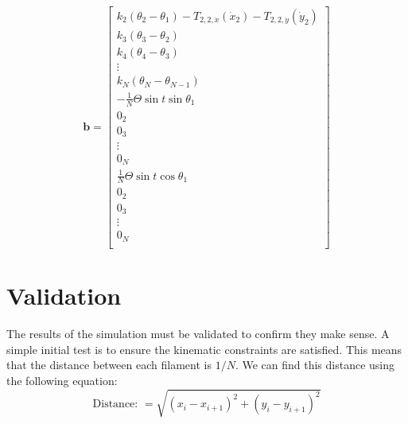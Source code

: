 \documentclass[12pt,letterpaper,titlepage]{article}
\begin{document}
\[
\mathbf{b} = \begin{bmatrix}
k_2 (\theta_2 - \theta_1) - T_{2,2,\dot{x}}(\dot{x}_2) - T_{2,2,\dot{y}}(\dot{y}_2)\\
k_3 (\theta_3 - \theta_2)\\
k_4 (\theta_4 - \theta_3)\\
\vdots \\
k_N (\theta_N - \theta_{N-1})\\
- \frac{1}{N} \Theta \sin t \sin \theta_1\\
0_2 \\
0_3 \\
\vdots \\
0_N \\
\frac{1}{N} \Theta \sin t \cos \theta_1\\
0_2 \\
0_3 \\
\vdots \\
0_N \\
\end{bmatrix} 
\]

\section{Validation}
The results of the simulation must be validated to confirm they make sense. A simple initial test is to ensure the kinematic constraints are satisfied. This means that the distance between each filament is $1/N$. We can find this distance using the following equation:
\begin{equation}
\text{Distance: } = \sqrt{(x_i - x_{i+1})^2 + (y_i - y_{i+1})^2}
\end{equation}
\end{document}

